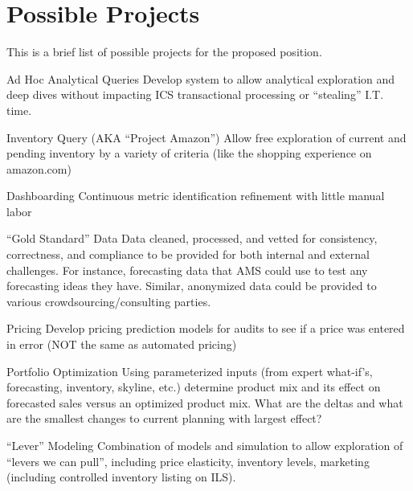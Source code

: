 \documentclass[10pt,journal,compsoc]{IEEEtran}
\begin{document}

\section{Possible Projects}

    This is a brief list of possible projects for the proposed position.

    \begin{LaTeXdescription}

    \item[Ad Hoc Analytical Queries]
        Develop system to allow analytical exploration and deep dives without
        impacting ICS transactional processing or ``stealing'' I.T. time.

    \item[Inventory Query (AKA ``Project Amazon'')]
        Allow free exploration of current and pending inventory by a variety of
        criteria (like the shopping experience on amazon.com)

    \item[Dashboarding]
        Continuous metric identification refinement with little manual labor

    \item[``Gold Standard'' Data]
        Data cleaned, processed, and vetted for consistency, correctness, and
        compliance to be provided for both internal and external challenges.  For
        instance, forecasting data that AMS could use to test any forecasting
        ideas they have.  Similar, anonymized data could be provided to various
        crowdsourcing/consulting parties.

    \item[Pricing]
        Develop pricing prediction models for audits to see if a price was entered
        in error (NOT the same as automated pricing)

    \item[Portfolio Optimization]
        Using parameterized inputs (from expert what-if's, forecasting, inventory,
        skyline, etc.) determine product mix and its effect on forecasted sales
        versus an optimized product mix.  What are the deltas and what are the
        smallest changes to current planning with largest effect?

    \item[``Lever'' Modeling]
        Combination of models and simulation to allow exploration of ``levers
        we can pull'', including price elasticity, inventory levels, marketing
        (including controlled inventory listing on ILS).


\end{LaTeXdescription}
\end{document}
